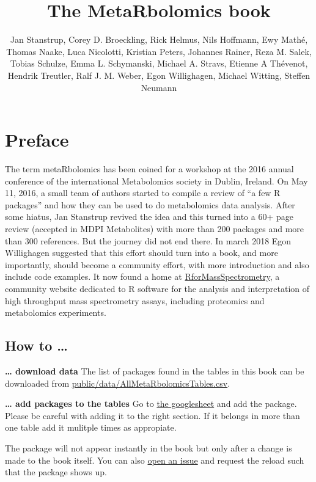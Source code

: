 \documentclass[]{article}
\title{The MetaRbolomics book}
\author{Jan Stanstrup, Corey D. Broeckling, Rick Helmus, Nils Hoffmann, Ewy Mathé, Thomas Naake, Luca Nicolotti, Kristian Peters, Johannes Rainer, Reza M. Salek, Tobias Schulze, Emma L. Schymanski, Michael A. Stravs, Etienne A Thévenot, Hendrik Treutler, Ralf J. M. Weber, Egon Willighagen, Michael Witting, Steffen Neumann}
\date{}
\begin{document}
\maketitle

{
\setcounter{tocdepth}{2}
\tableofcontents
}
\newpage

\hypertarget{preface}{%
\section*{Preface}\label{preface}}

The term metaRbolomics has been coined for a workshop at the 2016
annual conference of the international Metabolomics society in Dublin,
Ireland. On May 11, 2016, a small team of authors started to compile a
review of ``a few R packages'' and how they can be used to do
metabolomics data analysis. After some hiatus, Jan Stanstrup revived
the idea and this turned into a 60+ page review (accepted in MDPI
Metabolites) with more than 200 packages and more than 300
references. But the journey did not end there. In march 2018 Egon
Willighagen suggested that this effort should turn into a book, and
more importantly, should become a community effort, with more
introduction and also include code examples. It now found a home at
\href{https://rformassspectrometry.github.io/RforMassSpectrometry/}{RforMassSpectrometry},
a community website dedicated to R software for the analysis and
interpretation of high throughput mass spectrometry assays, including
proteomics and metabolomics experiments.

\hypertarget{how-to}{%
\subsection*{How to \ldots{}}\label{how-to}}

\textbf{\ldots{} download data}
The list of packages found in the tables in this book can be downloaded from
\url{public/data/AllMetaRbolomicsTables.csv}.

\textbf{\ldots{} add packages to the tables}
Go to \href{https://docs.google.com/spreadsheets/d/1QTe_FhiiFEJJ7hn25V973OV3Y9up8CsiLXgZXgTg_UU/edit?usp=sharing}{the googlesheet}
and add the package. Please be careful with adding it to the right section.
If it belongs in more than one table add it mulitple times as appropiate.

The package will not appear instantly in the book but only after a change is made to
the book itself. You can also \href{https://github.com/rformassspectrometry/metaRbolomics-book/issues}{open an issue}
and request the reload such that the package shows up.
\end{document}

